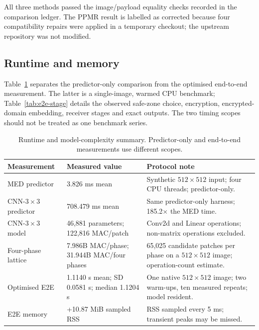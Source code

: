 \documentclass[preprint,12pt,a4paper]{elsarticle}
\begin{document}
All three methods passed the image/payload equality checks recorded in the comparison ledger. The PPMR result is labelled as corrected because four compatibility repairs were applied in a temporary checkout; the upstream repository was not modified.

\subsection{Runtime and memory}

Table~\ref{tab:runtime} separates the predictor-only comparison from the optimised end-to-end measurement. The latter is a single-image, warmed CPU benchmark; Table~\ref{tab:e2e-stage} details the observed safe-zone choice, encryption, encrypted-domain embedding, receiver stages and exact outputs. The two timing scopes should not be treated as one benchmark series.

\begin{table}[t]
\centering
\caption{Runtime and model-complexity summary. Predictor-only and end-to-end measurements use different scopes.}
\label{tab:runtime}
\scriptsize
\begin{tabularx}{\textwidth}{p{2.65cm}p{4.0cm}X}
\toprule
Measurement & Measured value & Protocol note\\
\midrule
MED predictor & 3.826 ms mean & Synthetic $512\times512$ input; four CPU threads; predictor-only.\\
CNN-$3\times3$ predictor & 708.479 ms mean & Same predictor-only harness; 185.2$\times$ the MED time.\\
CNN-$3\times3$ model & 46,881 parameters; 122,816 MAC/patch & Conv2d and Linear operations; non-matrix operations excluded.\\
Four-phase lattice & 7.986B MAC/phase; 31.944B MAC/four phases & 65,025 candidate patches per phase on a $512\times512$ image; operation-count estimate.\\
Optimised E2E & 1.1140 s mean; SD 0.0581 s; median 1.1204 s & One native $512\times512$ image; two warm-ups, ten measured repeats; model resident.\\
E2E memory & +10.87 MiB sampled RSS & RSS sampled every 5 ms; transient peaks may be missed.\\
\bottomrule
\end{tabularx}
\end{table}
\end{document}
